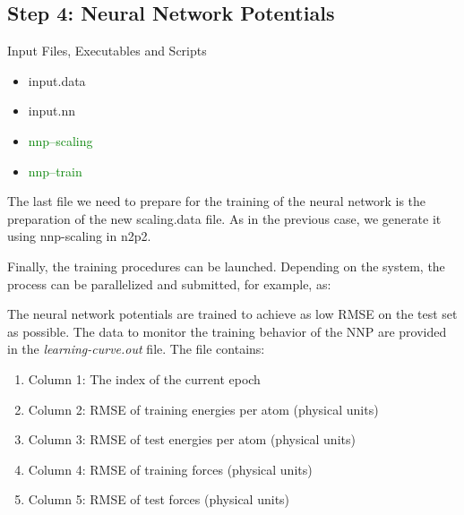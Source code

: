 \documentclass[12pt]{article}
\begin{document}
\subsection{Step 4: Neural Network Potentials}
\begin{mybox2}{{Input Files, Executables and Scripts}}
\begin{minipage}[c]{0.5\linewidth}
\end{minipage}
\begin{minipage}[c]{0.5\linewidth}
\begin{itemize}
  \item input.data
   \item input.nn
     \item \textcolor{green}{nnp--scaling}
   \item \textcolor{green}{nnp--train}
\end{itemize}
\end{minipage}
\end{mybox2}
The last file we need to prepare for the training of the neural network is the preparation of the new scaling.data file. As in the previous case, we generate it using nnp-scaling in n2p2.

Finally, the training procedures can be launched. Depending on the system, the process can be parallelized and submitted, for example, as:
\begin{center}
\end{center}

The neural network potentials are trained to achieve as low RMSE on the test set as possible. The data to monitor the training behavior of the NNP are provided in the \textit{learning-curve.out} file. The file contains:
\begin{enumerate}
    \item Column 1: The index of the current epoch
    \item Column 2: RMSE of training energies per atom (physical units)
    \item Column 3: RMSE of test energies per atom (physical units)
    \item Column 4: RMSE of training forces (physical units)
    \item Column 5: RMSE of test forces (physical units)
\end{enumerate}
\end{document}
